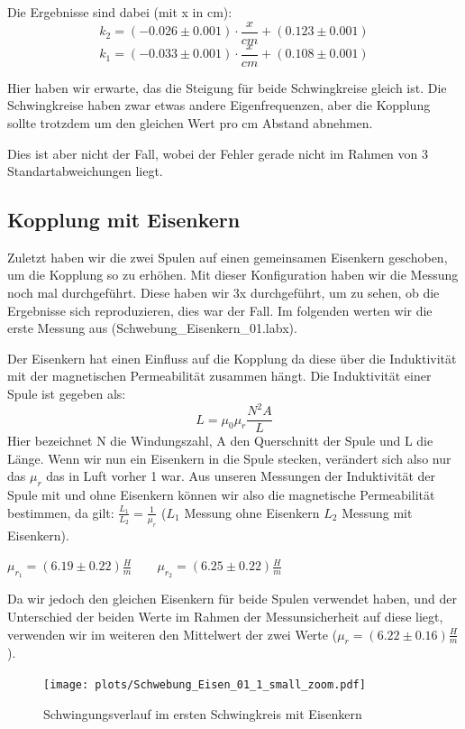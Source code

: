 \documentclass[twoside]{protokoll}
\begin{document}
Die Ergebnisse sind dabei (mit x in cm):
\begin{equation}
    k_2 = (-0.026 \pm 0.001) \cdot \frac{x}{cm} + (0.123 \pm 0.001)
\end{equation}
\begin{equation}
    k_1 = (-0.033 \pm 0.001) \cdot \frac{x}{cm} + (0.108 \pm 0.001)
\end{equation}

Hier haben wir erwarte, das die Steigung für beide Schwingkreise gleich ist. Die Schwingkreise haben zwar etwas andere Eigenfrequenzen, aber die Kopplung sollte trotzdem um den gleichen Wert pro cm Abstand abnehmen.

Dies ist aber nicht der Fall, wobei der Fehler gerade nicht im Rahmen von 3 Standartabweichungen liegt.

\subsection{Kopplung mit Eisenkern}


Zuletzt haben wir die zwei Spulen auf einen gemeinsamen Eisenkern geschoben, um die Kopplung so zu erhöhen. 
Mit dieser Konfiguration haben wir die Messung noch mal durchgeführt. 
Diese haben wir 3x durchgeführt, um zu sehen, ob die Ergebnisse sich reproduzieren, dies war der Fall.
Im folgenden werten wir die erste Messung aus (Schwebung\_Eisenkern\_01.labx).

Der Eisenkern hat einen Einfluss auf die Kopplung da diese über die Induktivität mit der magnetischen Permeabilität zusammen hängt.
Die Induktivität einer Spule ist gegeben als:
\begin{equation}
L = \mu_0 \mu_r \frac{N^2A}{L}
\end{equation}
Hier bezeichnet N die Windungszahl, A den Querschnitt der Spule und L die Länge.
Wenn wir nun ein Eisenkern in die Spule stecken, verändert sich also nur das $\mu_r$ das in Luft vorher 1 war.
Aus unseren Messungen der Induktivität der Spule mit und ohne Eisenkern können wir also die magnetische Permeabilität bestimmen, da gilt: $\frac{L_1}{L_2} = \frac{1}{\mu_r}$ ($L_1$ Messung ohne Eisenkern $L_2$ Messung mit Eisenkern).
\begin{center}
$\mu_{r_1} = (6.19 \pm 0.22)\frac{H}{m} \qquad \mu_{r_2} = (6.25 \pm 0.22)\frac{H}{m} $
\end{center}

Da wir jedoch den gleichen Eisenkern für beide Spulen verwendet haben, und der Unterschied der beiden Werte im Rahmen der Messunsicherheit auf diese liegt, verwenden wir im weiteren den Mittelwert der zwei Werte ($\mu_r = (6.22 \pm 0.16)\frac{H}{m}$).
\begin{figure}[H]
    \centering
    \texttt{[image: plots/Schwebung\_Eisen\_01\_1\_small\_zoom.pdf]}
    \caption{Schwingungsverlauf im ersten Schwingkreis mit Eisenkern }
\end{figure}
\end{document}
